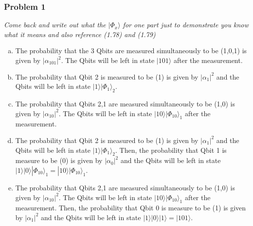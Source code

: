\documentclass[a4paper,11pt]{article}
\begin{document}
\subsubsection*{Problem 1}
\emph{\color{red} Come back and write out what the $|\Phi_x\rangle$ for one part just to demonstrate you know what it means and also reference (1.78) and (1.79)}
\begin{enumerate}[a)]
    \item The probability that the 3 Qbits are measured simultaneously to be (1,0,1) is given by $|\alpha_{101}|^2$. The Qbits will be left in state $|101\rangle$ after the measurement.
    \item The probability that Qbit 2 is measured to be (1) is given by $|\alpha_1|^2$ and the Qbits will be left in state $|1\rangle|\Phi_1\rangle_2$.
    \item The probability that Qbits 2,1 are measured simultaneously to be (1,0) is given by $|\alpha_{10}|^2$. The Qbits will be left in state $|10\rangle|\Phi_{10}\rangle_1$ after the measurement.
    \item The probability that Qbit 2 is measured to be (1) is given by $|\alpha_1|^2$ and the Qbits will be left in state $|1\rangle|\Phi_1\rangle_2$. Then, the probability that Qbit 1 is measure to be (0) is given by $|\alpha_0|^2$ and the Qbits will be left in state $|1\rangle|0\rangle|\Phi_{10}\rangle_1=|10\rangle|\Phi_{10}\rangle_1$.
    \item The probability that Qbits 2,1 are measured simultaneously to be (1,0) is given by $|\alpha_{10}|^2$. The Qbits will be left in state $|10\rangle|\Phi_{10}\rangle_1$ after the measurement. Then, the probability that Qbit 0 is measure to be (1) is given by $|\alpha_1|^2$ and the Qbits will be left in state $|1\rangle|0\rangle|1\rangle=|101\rangle$.
\end{enumerate}
\end{document}
